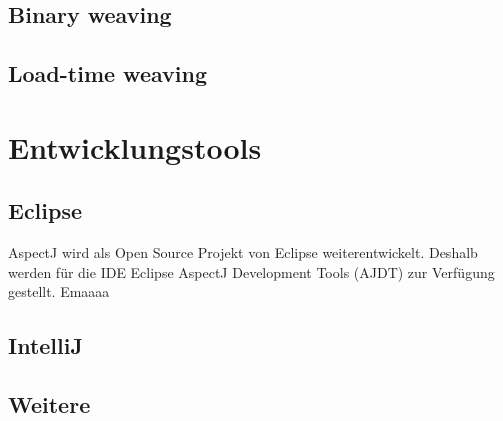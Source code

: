 \subsection{Binary weaving}

\subsection{Load-time weaving}

\section{Entwicklungstools}
\subsection{Eclipse}
AspectJ wird als Open Source Projekt von Eclipse weiterentwickelt. Deshalb werden für die IDE Eclipse AspectJ Development Tools (AJDT) zur Verfügung gestellt. Emaaaa \cite{eclipse:ajdt}
\subsection{IntelliJ}
\subsection{Weitere}